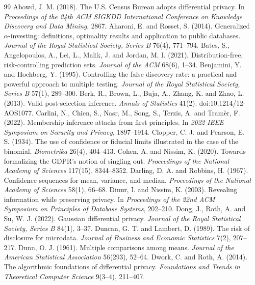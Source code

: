 \documentclass{jpc}
\theoremstyle{remark}
\begin{document}
\begin{thebibliography}{99}\small
{} Abowd, J. M. (2018). The U.S. Census Bureau adopts differential privacy. In \emph{Proceedings of the 24th ACM SIGKDD International Conference on Knowledge Discovery and Data Mining}, 2867.
 Aharoni, E. and Rosset, S. (2014). Generalized $\alpha$-investing: definitions, optimality results and application to public databases. \emph{Journal of the Royal Statistical Society, Series B} 76(4), 771--794.
 Bates, S., Angelopoulos, A., Lei, L., Malik, J. and Jordan, M. I. (2021). Distribution-free, risk-controlling prediction sets. \emph{Journal of the ACM} 68(6), 1--34.
 Benjamini, Y. and Hochberg, Y. (1995). Controlling the false discovery rate: a practical and powerful approach to multiple testing. \emph{Journal of the Royal Statistical Society, Series B} 57(1), 289--300.
 Berk, R., Brown, L., Buja, A., Zhang, K. and Zhao, L. (2013). Valid post-selection inference. \emph{Annals of Statistics} 41(2). doi:10.1214/12-AOS1077.
 Carlini, N., Chien, S., Nasr, M., Song, S., Terzis, A. and Tram\`er, F. (2022). Membership inference attacks from first principles. In \emph{2022 IEEE Symposium on Security and Privacy}, 1897--1914.
 Clopper, C. J. and Pearson, E. S. (1934). The use of confidence or fiducial limits illustrated in the case of the binomial. \emph{Biometrika} 26(4), 404--413.
 Cohen, A. and Nissim, K. (2020). Towards formalizing the GDPR's notion of singling out. \emph{Proceedings of the National Academy of Sciences} 117(15), 8344--8352.
 Darling, D. A. and Robbins, H. (1967). Confidence sequences for mean, variance, and median. \emph{Proceedings of the National Academy of Sciences} 58(1), 66--68.
 Dinur, I. and Nissim, K. (2003). Revealing information while preserving privacy. In \emph{Proceedings of the 22nd ACM Symposium on Principles of Database Systems}, 202--210.
 Dong, J., Roth, A. and Su, W. J. (2022). Gaussian differential privacy. \emph{Journal of the Royal Statistical Society, Series B} 84(1), 3--37.
 Duncan, G. T. and Lambert, D. (1989). The risk of disclosure for microdata. \emph{Journal of Business and Economic Statistics} 7(2), 207--217.
 Dunn, O. J. (1961). Multiple comparisons among means. \emph{Journal of the American Statistical Association} 56(293), 52--64.
 Dwork, C. and Roth, A. (2014). The algorithmic foundations of differential privacy. \emph{Foundations and Trends in Theoretical Computer Science} 9(3--4), 211--407.

\end{thebibliography}
\end{document}
